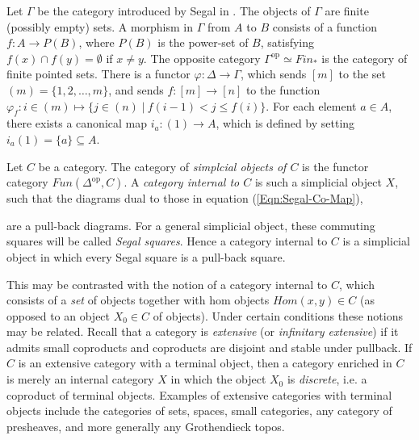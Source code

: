 \documentclass{amsart}
\begin{document}
Let $\Gamma$ be the category introduced by Segal in \cite{Segal-Categories and Cohomology Theories}. The objects of $\Gamma$ are finite (possibly empty) sets. A morphism in $\Gamma$ from $A$ to $B$ consists of a function $f: A \to P(B)$, where $P(B)$ is the power-set of $B$, satisfying $f(x) \cap f(y) = \emptyset$ if $x \neq y$. The opposite category $\Gamma^\textrm{op} \simeq Fin_*$ is the category of finite pointed sets. There is a functor $\varphi:\Delta \to \Gamma$, which sends $[m]$ to the set $(m) = \{ 1, 2, \dots, m\}$, and sends $f: [m] \to [n]$ to the function $\varphi_f: i \in (m) \mapsto \{ j \in (n) \; | \: f(i-1) < j \leq f(i) \}$. For each element $a \in A$, there exists a canonical map $i_a: (1) \to A$, which is defined by setting $i_a(1) = \{a\} \subseteq A$. 


Let $C$ be a category. The category of {\em simplcial objects of $C$} is the functor category $Fun(\Delta^\textrm{op}, C)$. A {\em category internal to $C$} is such a simplicial object $X$, such that the diagrams dual to those in equation (\ref{Eqn:Segal-Co-Map}),
\begin{center}
\end{center}
are a pull-back diagrams. For a general simplicial object, these commuting squares will be called {\em Segal squares}. Hence a category internal to $C$ is a simplicial object in which every Segal square is a pull-back square. 

This may be contrasted with the notion of a category internal to $C$, which consists of a {\em set} of objects together with hom objects $Hom(x,y) \in C$ (as opposed to an object $X_0 \in C$ of objects). Under certain conditions these notions may be related. Recall that a category is {\em extensive} (or {\em infinitary extensive}) if it admits small coproducts and coproducts are disjoint and stable under pullback. If $C$ is an extensive category with a terminal object, then a category enriched in $C$ is merely an internal category $X$ in which the object $X_0$ is {\em discrete}, i.e. a coproduct of terminal objects. Examples of extensive categories with terminal objects include the categories of sets, spaces, small categories, any category of presheaves, and more generally any Grothendieck topos. 
\end{document}
